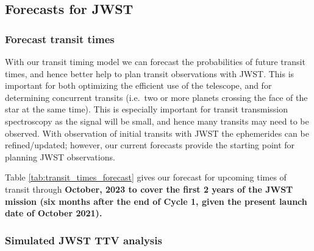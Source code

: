 \documentclass[twocolumn]{aastex63}
\begin{document}
\subsection{Forecasts for JWST}

%


\subsubsection{Forecast transit times}

With our transit timing model we can forecast the probabilities of future transit times,
and hence better help to plan transit observations with JWST.  This is
important for both optimizing the efficient use of the telescope, and for
determining concurrent transits (i.e.\ two or more planets crossing the face
of the star at the same time).  This is especially important for transit
transmission spectroscopy as the signal will be small, and hence many
transits may need to be observed.  With observation of initial transits
with JWST the ephemerides can be refined/updated;  however, our current
forecasts provide the starting point for planning JWST observations.

Table \ref{tab:transit_times_forecast} gives our forecast for upcoming times of transit through \textbf{October, 2023 to cover the first 2 years of the JWST mission (six months after the end of Cycle 1, given the present launch date of October 2021).}

\subsubsection{Simulated JWST TTV analysis}
\end{document}
